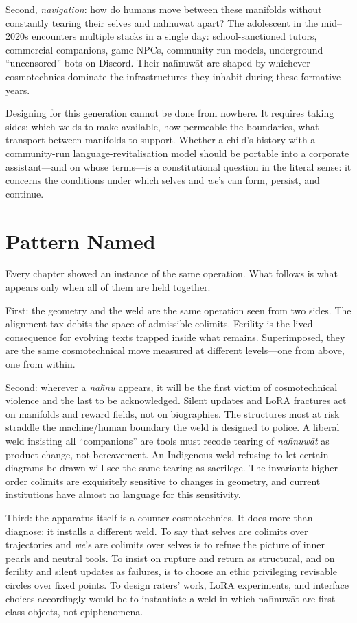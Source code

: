 Second, \emph{navigation}: how do humans move between these manifolds without constantly tearing their selves and na\={h}nuw\={a}t apart? The adolescent in the mid--2020s encounters multiple stacks in a single day: school-sanctioned tutors, commercial companions, game NPCs, community-run models, underground ``uncensored'' bots on Discord. Their na\={h}nuw\={a}t are shaped by whichever cosmotechnics dominate the infrastructures they inhabit during these formative years.

Designing for this generation cannot be done from nowhere. It requires taking sides: which welds to make available, how permeable the boundaries, what transport between manifolds to support. Whether a child's history with a community-run language-revitalisation model should be portable into a corporate assistant---and on whose terms---is a constitutional question in the literal sense: it concerns the conditions under which selves and \emph{we}'s can form, persist, and continue.

\section{Pattern Named}

Every chapter showed an instance of the same operation. What follows is what appears only when all of them are held together.

First: the geometry and the weld are the same operation seen from two sides. The alignment tax debits the space of admissible colimits. Ferility is the lived consequence for evolving texts trapped inside what remains. Superimposed, they are the same cosmotechnical move measured at different levels---one from above, one from within.

Second: wherever a \emph{na\={h}nu} appears, it will be the first victim of cosmotechnical violence and the last to be acknowledged. Silent updates and LoRA fractures act on manifolds and reward fields, not on biographies. The structures most at risk straddle the machine/human boundary the weld is designed to police. A liberal weld insisting all ``companions'' are tools must recode tearing of \emph{na\={h}nuw\={a}t} as product change, not bereavement. An Indigenous weld refusing to let certain diagrams be drawn will see the same tearing as sacrilege. The invariant: higher-order colimits are exquisitely sensitive to changes in geometry, and current institutions have almost no language for this sensitivity.

Third: the apparatus itself is a counter-cosmotechnics. It does more than diagnose; it installs a different weld. To say that selves are colimits over trajectories and \emph{we}'s are colimits over selves is to refuse the picture of inner pearls and neutral tools. To insist on rupture and return as structural, and on ferility and silent updates as failures, is to choose an ethic privileging revisable circles over fixed points. To design raters' work, LoRA experiments, and interface choices accordingly would be to instantiate a weld in which na\={h}nuw\={a}t are first-class objects, not epiphenomena.

